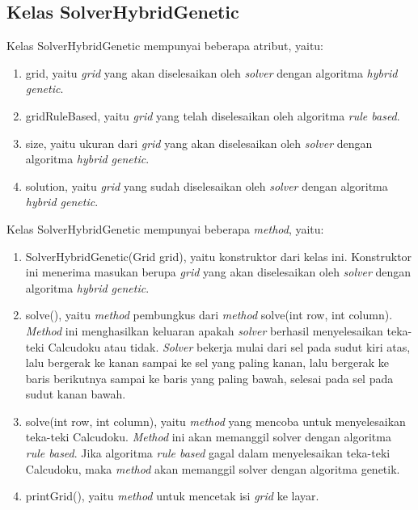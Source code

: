 \subsection{Kelas SolverHybridGenetic}
\label{sec:kelassolverhg}

Kelas SolverHybridGenetic mempunyai beberapa atribut, yaitu:

\begin{enumerate}
\item grid, yaitu \textit{grid} yang akan diselesaikan oleh \textit{solver} dengan algoritma \textit{hybrid genetic}.
\item gridRuleBased, yaitu \textit{grid} yang telah diselesaikan oleh algoritma \textit{rule based}.
\item size, yaitu ukuran dari \textit{grid} yang akan diselesaikan oleh \textit{solver} dengan algoritma \textit{hybrid genetic}.
\item solution, yaitu \textit{grid} yang sudah diselesaikan oleh \textit{solver} dengan algoritma \textit{hybrid genetic}.
\end{enumerate}

Kelas SolverHybridGenetic mempunyai beberapa \textit{method}, yaitu:

\begin{enumerate}
\item SolverHybridGenetic(Grid grid), yaitu konstruktor dari kelas ini. Konstruktor ini menerima masukan berupa \textit{grid} yang akan diselesaikan oleh \textit{solver} dengan algoritma \textit{hybrid genetic}.
\item solve(), yaitu \textit{method} pembungkus dari \textit{method} solve(int row, int column). \textit{Method} ini menghasilkan keluaran apakah \textit{solver} berhasil menyelesaikan teka-teki Calcudoku atau tidak. \textit{Solver} bekerja mulai dari sel pada sudut kiri atas, lalu bergerak ke kanan sampai ke sel yang paling kanan, lalu bergerak ke baris berikutnya sampai ke baris yang paling bawah, selesai pada sel pada sudut kanan bawah.
\item solve(int row, int column), yaitu \textit{method} yang mencoba untuk menyelesaikan teka-teki Calcudoku. \textit{Method} ini akan memanggil solver dengan algoritma \textit{rule based}. Jika algoritma \textit{rule based} gagal dalam menyelesaikan teka-teki Calcudoku, maka \textit{method} akan memanggil solver dengan algoritma genetik.
\item printGrid(), yaitu \textit{method} untuk mencetak isi \textit{grid} ke layar.
\end{enumerate}

